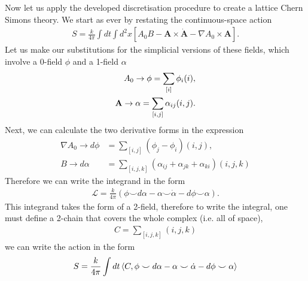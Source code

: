 \documentclass[11pt, oneside]{article} %
\numberwithin{equation}{section}
\begin{document}
Now let us apply the developed discretisation procedure to create  a lattice Chern Simons theory. We start as ever by restating the continuous-space action
\begin{align}
    S = \frac{k}{4\pi}
    \int dt \int d^2x
    \left [  
    A_0  B -
    \textbf {A} \times \dot {\textbf {A}} -
    \nabla A_0  \times  \textbf {A}
    \right ].
\end{align}
Let us make our substitutions for the simplicial versions of these fields, which involve a 0-field $\phi$ and a 1-field $\alpha$
\begin{align}
    A_0 \rightarrow \phi = \sum_{[i]}\phi_i(i),\\
    \textbf A \rightarrow \alpha = \sum_{[i,j]}\alpha_{ij} (i,j).
\end{align}
Next, we can calculate the two derivative forms in the expression
\begin{align}
    \nabla A_0 \rightarrow d\phi &= \sum_{[i,j]}(\phi_j - \phi_i) (i,j),\\
    B \rightarrow d\alpha  &= \sum_{[i,j,k]} ( \alpha_{ij} + \alpha_{jk} + \alpha_{ki}) (i,j,k)
\end{align}
Therefore we can write the integrand in the form
\begin{align}
    \mathcal L  = \frac k{4\pi} \left (  \phi \smile d\alpha 
    - \alpha \smile \dot \alpha 
    -d\phi \smile \alpha
    \right ).
\end{align}
This integrand takes the form of a 2-field, therefore to write the integral, one must define a 2-chain that covers the whole complex (i.e. all of space),
\begin{align}
    C = \sum_{[i,j,k]} (i,j,k)
\end{align}
we can write the action in the form
\begin{align}
    S = \frac k{4\pi} \int dt \left \langle C, 
    \phi \smile d\alpha 
    - \alpha \smile \dot \alpha 
    -d\phi \smile \alpha
     \right \rangle
\end{align}
\end{document}
